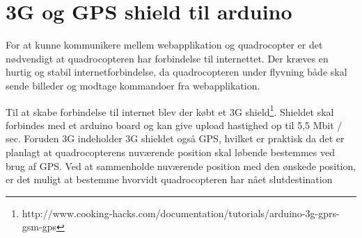\section{3G og GPS shield til arduino}

For at kunne kommunikere mellem webapplikation og quadrocopter er det nødvendigt at quadrocopteren har forbindelse til internettet. Der kræves en hurtig og stabil internetforbindelse, da quadrocopteren under flyvning både skal sende billeder og modtage kommandoer fra webapplikation.

Til at skabe forbindelse til internet blev der købt et 3G shield\footnote{http://www.cooking-hacks.com/documentation/tutorials/arduino-3g-gprs-gsm-gps}. Shieldet skal forbindes med et arduino board og kan give upload hastighed op til 5,5 Mbit / sec. Foruden 3G indeholder 3G shieldet også GPS, hvilket er praktisk da det er planlagt at quadrocopterens nuværende position skal løbende bestemmes ved brug af GPS. Ved at sammenholde nuværende position med den ønskede position, er det muligt at bestemme hvorvidt quadrocopteren har nået slutdestination   
